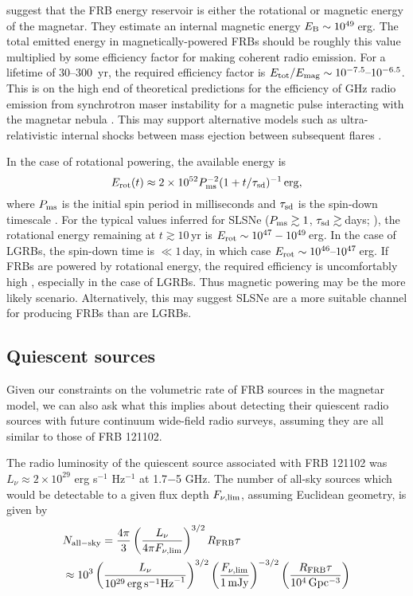 \documentclass[twocolumn]{aastex6}
\begin{document}
\citet{mbm.2017} suggest that the FRB energy reservoir is either the rotational or magnetic energy of the magnetar. They estimate an internal magnetic energy $E_{\rm B}\sim10^{49}$\,erg. The total emitted energy in magnetically-powered FRBs should be roughly this value multiplied by some efficiency factor for making coherent radio emission. For a lifetime of 30--300~yr, the required efficiency factor is $E_{\rm tot}/E_{\rm mag} \sim 10^{-7.5}\text{--}10^{-6.5}$.  This is on the high end of theoretical predictions for the efficiency of GHz radio emission from synchrotron maser instability for a magnetic pulse interacting with the magnetar nebula \citep{lyu2014}.  This may support alternative models such as ultra-relativistic internal shocks between mass ejection between subsequent flares \citep{bel2017}.

In the case of rotational powering, the available energy is 
\begin{equation}
E_{\rm rot}(t) \approx 2 \times 10^{52} P_{\rm ms}^{-2} (1+ t/\tau_{\rm sd})^{-1}\,{\rm erg},
\end{equation}
where $P_{\rm ms}$ is the initial spin period in milliseconds and $\tau_{\rm sd}$ is the spin-down timescale \citep{ost1971,kas2010}. For the typical values inferred for SLSNe ($P_{\rm ms} \gtrsim 1$, $\tau_{\rm sd} \gtrsim$\,days; \citealt{nic2017b}), the rotational energy remaining at $t \gtrsim 10$\,yr is $E_{\rm rot} \sim 10^{47}-10^{49}$\,erg. In the case of LGRBs, the spin-down time is $\ll 1$\,day, in which case $E_{\rm rot} \sim 10^{46}\text{--}10^{47}$\,erg. If FRBs are powered by rotational energy, the required efficiency is uncomfortably high \citep{Lyutikov17,mbm.2017}, especially in the case of LGRBs.  Thus magnetic powering may be the more likely scenario.  Alternatively, this may suggest SLSNe are a more suitable channel for producing FRBs than are LGRBs.


\subsection{Quiescent sources}

Given our constraints on the volumetric rate of FRB sources in the magnetar model, we can also ask what this implies about detecting their quiescent radio sources with future continuum wide-field radio surveys, assuming they are all similar to those of FRB 121102.

The radio luminosity of the quiescent source associated with FRB 121102 was $L_{\nu} \approx 2\times 10^{29}$ erg s$^{-1}$ Hz$^{-1}$ at 1.7$-$5 GHz.  The number of all-sky sources which would be detectable to a given flux depth $F_{\nu, \rm lim}$, assuming Euclidean geometry, is given by
\begin{align}
&N_{\rm all-sky} = \frac{4\pi}{3}\left(\frac{L_{\nu}}{4\pi F_{\nu, \rm lim}}\right)^{3/2}{R}_{\rm FRB}\tau  \nonumber \\
&\approx 10^3\left(\frac{L_{\nu}}{10^{29}\,{\rm erg}\,{\rm s}^{-1} {\rm Hz}^{-1}}\right)^{3/2} \left(\frac{F_{\nu, \rm lim}}{\rm 1\,mJy}\right)^{-3/2} \left(\frac{{R}_{\rm FRB}\tau }{10^{4}\,{\rm Gpc^{-3}}}\right)
\end{align}
\end{document}
